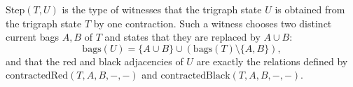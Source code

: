 \(\mathrm{Step}(T,U)\) is the type of witnesses that the trigraph state
\(U\) is obtained from the trigraph state \(T\) by one contraction.  Such a
witness chooses two distinct current bags \(A,B\) of \(T\) and states that they
are replaced by \(A\cup B\):
\[
  \mathrm{bags}(U)=\{A\cup B\}\cup
    (\mathrm{bags}(T)\setminus\{A,B\}),
\]
and that the red and black adjacencies of \(U\) are exactly the relations
defined by \(\mathrm{contractedRed}(T,A,B,-,-)\) and
\(\mathrm{contractedBlack}(T,A,B,-,-)\).
